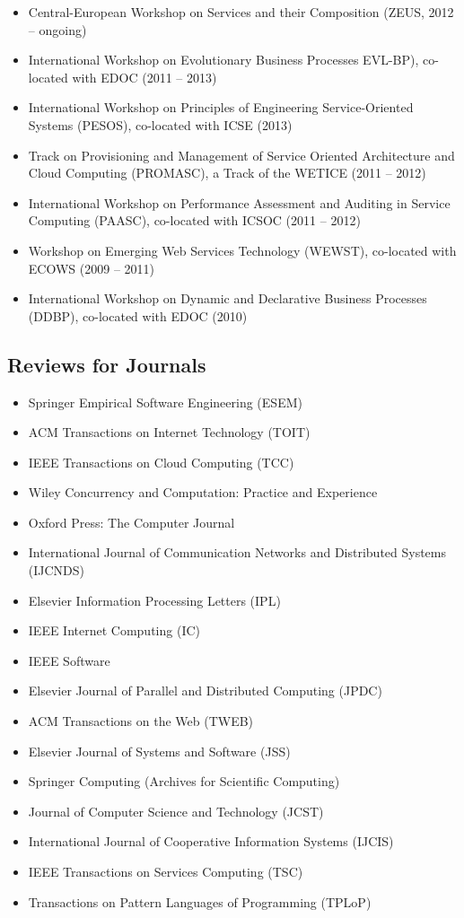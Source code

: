 \documentclass[paper=letter,fontsize=11pt]{scrartcl} %
\begin{document}
\begin{itemize}
  \item Central-European Workshop on Services and their Composition (ZEUS, 2012 -- ongoing)
  \item International Workshop on Evolutionary Business Processes EVL-BP), co-located with EDOC (2011 -- 2013)
  \item International Workshop on Principles of Engineering Service-Oriented Systems (PESOS), co-located with ICSE (2013)
  \item Track on Provisioning and Management of Service Oriented Architecture and Cloud Computing (PROMASC), a Track of the WETICE (2011 -- 2012)
  \item International Workshop on Performance Assessment and Auditing in Service Computing (PAASC), co-located with ICSOC (2011 -- 2012)
  \item Workshop on Emerging Web Services Technology (WEWST), co-located
  with ECOWS (2009 -- 2011)
  \item International Workshop on Dynamic and Declarative Business
  Processes (DDBP), co-located with EDOC (2010)
\end{itemize}

\subsection*{Reviews for Journals}

\begin{itemize}
\item Springer Empirical Software Engineering (ESEM)
\item ACM Transactions on Internet Technology (TOIT)
\item IEEE Transactions on Cloud Computing (TCC)
\item Wiley Concurrency and Computation: Practice and Experience
\item Oxford Press: The Computer Journal
\item International Journal of Communication Networks and Distributed Systems (IJCNDS)
\item Elsevier Information Processing Letters (IPL)
\item IEEE Internet Computing (IC)
\item IEEE Software
\item Elsevier Journal of Parallel and Distributed Computing (JPDC)
\item ACM Transactions on the Web (TWEB)
\item Elsevier Journal of Systems and Software (JSS)
\item Springer Computing (Archives for Scientific Computing)
\item Journal of Computer Science and Technology (JCST)
\item International Journal of Cooperative Information Systems (IJCIS)
\item IEEE Transactions on Services Computing (TSC)
\item Transactions on Pattern Languages of Programming (TPLoP)
\end{itemize}
\end{document}
